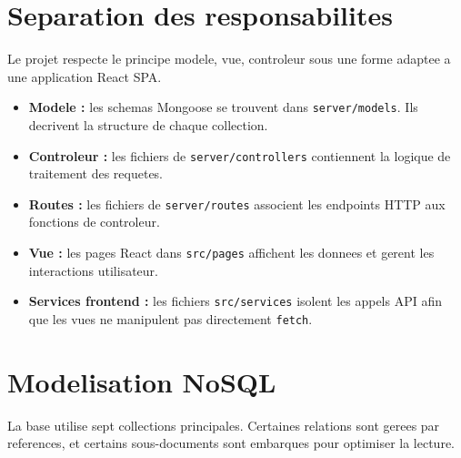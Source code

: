 \documentclass[12pt,a4paper]{report}
\begin{document}
\section{Separation des responsabilites}

Le projet respecte le principe modele, vue, controleur sous une forme adaptee a une application React SPA.

\begin{itemize}[leftmargin=*]
  \item \textbf{Modele :} les schemas Mongoose se trouvent dans \texttt{server/models}. Ils decrivent la structure de chaque collection.
  \item \textbf{Controleur :} les fichiers de \texttt{server/controllers} contiennent la logique de traitement des requetes.
  \item \textbf{Routes :} les fichiers de \texttt{server/routes} associent les endpoints HTTP aux fonctions de controleur.
  \item \textbf{Vue :} les pages React dans \texttt{src/pages} affichent les donnees et gerent les interactions utilisateur.
  \item \textbf{Services frontend :} les fichiers \texttt{src/services} isolent les appels API afin que les vues ne manipulent pas directement \texttt{fetch}.
\end{itemize}

\section{Modelisation NoSQL}

La base utilise sept collections principales. Certaines relations sont gerees par references, et certains sous-documents sont embarques pour optimiser la lecture.
\end{document}
